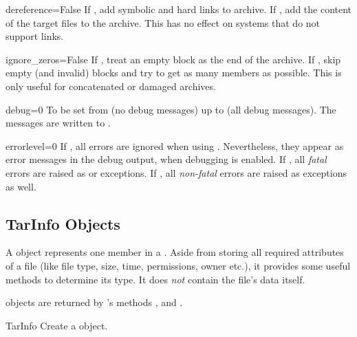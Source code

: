 \begin{memberdesc}{dereference=False}
    If , add symbolic and hard links to archive. If ,
    add the content of the target files to the archive. This has no effect on
    systems that do not support links.
\end{memberdesc}

\begin{memberdesc}{ignore_zeros=False}
    If , treat an empty block as the end of the archive. If
    , skip empty (and invalid) blocks and try to get as many
    members as possible. This is only useful for concatenated or damaged
    archives.
\end{memberdesc}

\begin{memberdesc}{debug=0}
    To be set from (no debug messages) up to (all debug
    messages). The messages are written to .
\end{memberdesc}

\begin{memberdesc}{errorlevel=0}
    If , all errors are ignored when using .
    Nevertheless, they appear as error messages in the debug output, when
    debugging is enabled.
    If , all \emph{fatal} errors are raised as 
    or  exceptions.
    If , all \emph{non-fatal} errors are raised as 
    exceptions as well.
\end{memberdesc}


\subsection{TarInfo Objects \label{tarinfo-objects}}

A  object represents one member in a . Aside from
storing all required attributes of a file (like file type, size, time,
permissions, owner etc.), it provides some useful methods to determine its
type. It does \emph{not} contain the file's data itself.

 objects are returned by 's methods
,  and .

\begin{classdesc}{TarInfo}{}
    Create a  object.
\end{classdesc}

